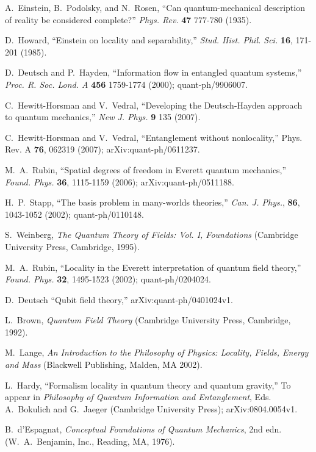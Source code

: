 \documentclass[12pt]{article}
\begin{document}
{\begin{thebibliography}{99}
A.~Einstein, B.~Podolsky, and N.~Rosen,  ``Can quantum-mechanical 
description of reality be considered complete?'' {\em Phys. Rev.}\/ {\bf 47} 777-780 (1935).

 D.~Howard, ``Einstein on locality and separability,'' {\em  Stud. Hist. Phil. Sci.}\/  {\bf 16}, 171-201
(1985).

 D.~Deutsch and P.~Hayden,   ``Information flow in entangled
quantum systems,'' {\em Proc. R. Soc. Lond. A}\/ {\bf456} 1759-1774 (2000);
quant-ph/9906007.

 C.~Hewitt-Horsman and V.~Vedral, ``Developing the Deutsch-Hayden approach to quantum mechanics,''
{\em New J. Phys.} {\bf  9} 135 (2007).

 C.~Hewitt-Horsman and V.~Vedral, ``Entanglement without nonlocality,'' {Phys. Rev. A} {\bf 76}, 
062319 (2007); arXiv:quant-ph/0611237.

M.~A.~Rubin, ``Spatial degrees of freedom in Everett quantum mechanics,'' {\em Found. Phys.} {\bf 36}, 1115-1159
(2006); arXiv:quant-ph/0511188.

H.~P.~Stapp, ``The basis problem in many-worlds theories,'' {\em Can. J. Phys.}\/, {\bf 86}, 1043-1052 (2002); quant-ph/0110148.

S.~Weinberg, {\em The Quantum Theory of Fields: Vol. I, Foundations}
(Cambridge University Press, Cambridge, 1995).

 M.~A.~Rubin,  ``Locality in the Everett interpretation of 
quantum field theory,'' {\em Found. Phys.}\/ {\bf 32}, 1495-1523 (2002); quant-ph/0204024.

 D.~Deutsch ``Qubit field theory,'' arXiv:quant-ph/0401024v1.

L.~Brown, {\em Quantum Field Theory}\/ (Cambridge University Press, Cambridge, 1992).

M.~Lange, {\em An Introduction to the Philosophy of Physics: Locality, Fields, Energy
and Mass}\/ (Blackwell Publishing, Malden, MA 2002).

L.~Hardy, ``Formalism locality in quantum theory
and quantum gravity,'' To appear in {\em Philosophy of Quantum Information and Entanglement}\/,  Eds. A.~Bokulich and G.~Jaeger 
(Cambridge University Press);  arXiv:0804.0054v1.

 B.~d'Espagnat, {\em Conceptual Foundations of Quantum Mechanics}\/,
2nd edn. (W.~A.~Benjamin, Inc., Reading, MA, 1976).



\end{thebibliography}}
\end{document}
